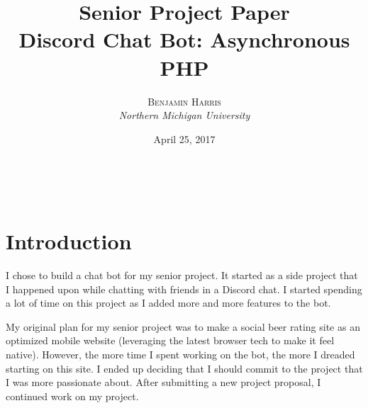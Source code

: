\documentclass[12pt]{article} %
\title{\textbf{Senior Project Paper}\\ %
Discord Chat Bot: Asynchronous PHP} %
\author{\textsc{Benjamin Harris} %
\\{\textit{Northern Michigan University}}} %
\date{April 25, 2017} %
\makeatletter
\renewcommand{\maketitle}{ %
\begin{flushright} %
{\LARGE\@title} %

\vspace{50pt} %

{\large\@author} %
\\\@date %

\vspace{40pt} %
\end{flushright}
}
\makeatother
\begin{document}
\maketitle %







\section*{Introduction}

I chose to build a chat bot for my senior project. It started as a side project that I happened upon while chatting with friends in a Discord chat. I started spending a lot of time on this project as I added more and more features to the bot. 

My original plan for my senior project was to make a social beer rating site as an optimized mobile website (leveraging the latest browser tech to make it feel native). However, the more time I spent working on the bot, the more I dreaded starting on this site. I ended up deciding that I should commit to the project that I was more passionate about. After submitting a new project proposal, I continued work on my project.
\end{document}
